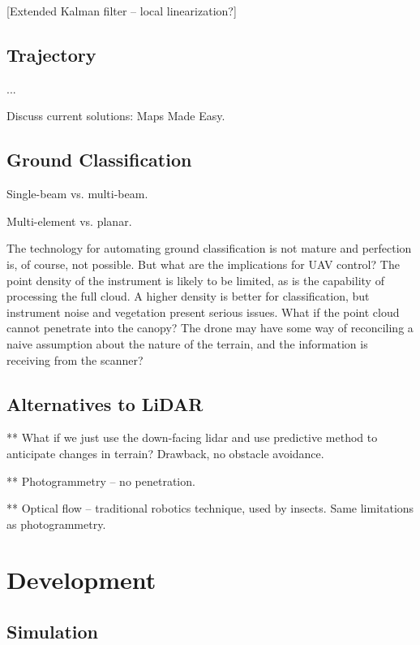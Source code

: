 \documentclass[10pt,a4paper]{report}
\begin{document}
[Extended Kalman filter -- local linearization?]

\subsection{Trajectory}

...

Discuss current solutions: Maps Made Easy.



\subsection{Ground Classification}

Single-beam vs. multi-beam.

Multi-element vs. planar. \cite{Nobili2015}

The technology for automating ground classification is not mature \cite{Vosselman2001,Vosselman2000} and perfection is, of course, not possible. But what are the implications for UAV control? The point density of the instrument is likely to be limited, as is the capability of processing the full cloud. A higher density is better for classification, but instrument noise and vegetation present serious issues. What if the point cloud cannot penetrate into the canopy? The drone may have some way of reconciling a naive assumption about the nature of the terrain, and the information is receiving from the scanner?


\subsection{Alternatives to LiDAR}

** What if we just use the down-facing lidar and use predictive method to anticipate changes in terrain? Drawback, no obstacle avoidance.

** Photogrammetry -- no penetration.

** Optical flow -- traditional robotics technique, used by insects. Same limitations as photogrammetry.


\section{Development}


\subsection{Simulation}
\end{document}
